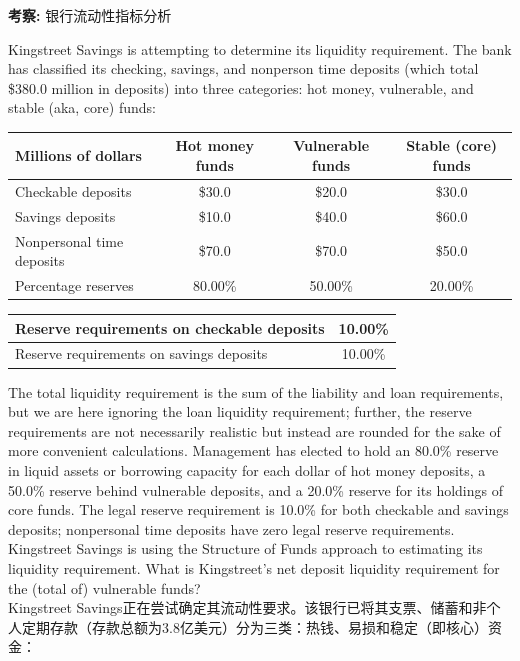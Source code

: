\documentclass{article}
\newcounter{question} %
\newcommand{\checklist}[1]{
    \textbf{考察:} #1 \par %
    \addcontentsline{toc}{subsection}{题号\thequestion 考察: #1} %
    \vspace{2em} %
}
\begin{document}
\checklist{银行流动性指标分析}


\begin{question}
    Kingstreet Savings is attempting to determine its liquidity requirement. The bank has classified its checking, savings, and nonperson time deposits (which total \$380.0 million in deposits) into three categories: hot money, vulnerable, and stable (aka, core) funds:

    \begin{table}[htbp]
        \centering
        \begin{tabular}{|l|c|c|c|}
            \hline
            \textbf{Millions of dollars} & \textbf{Hot money funds} & \textbf{Vulnerable funds} & \textbf{Stable (core) funds} \\
            \hline
            Checkable deposits         & \$30.0 & \$20.0 & \$30.0 \\
            Savings deposits           & \$10.0 & \$40.0 & \$60.0 \\
            Nonpersonal time deposits  & \$70.0 & \$70.0 & \$50.0 \\
            \hline
            Percentage reserves        & 80.00\% & 50.00\% & 20.00\% \\
            \hline
        \end{tabular}
    \end{table}

    \begin{table}[htbp]
        \centering
        \begin{tabular}{|l|c|}
            \hline
            Reserve requirements on checkable deposits & 10.00\% \\
            \hline
            Reserve requirements on savings deposits   & 10.00\% \\
            \hline
        \end{tabular}
    \end{table}

    The total liquidity requirement is the sum of the liability and loan requirements, but we are here ignoring the loan liquidity requirement; further, the reserve requirements are not necessarily realistic but instead are rounded for the sake of more convenient calculations. Management has elected to hold an 80.0\% reserve in liquid assets or borrowing capacity for each dollar of hot money deposits, a 50.0\% reserve behind vulnerable deposits, and a 20.0\% reserve for its holdings of core funds. The legal reserve requirement is 10.0\% for both checkable and savings deposits; nonpersonal time deposits have zero legal reserve requirements. Kingstreet Savings is using the Structure of Funds approach to estimating its liquidity requirement. What is Kingstreet's net deposit liquidity requirement for the (total of) vulnerable funds?
    \\Kingstreet Savings正在尝试确定其流动性要求。该银行已将其支票、储蓄和非个人定期存款（存款总额为3.8亿美元）分为三类：热钱、易损和稳定（即核心）资金：


\end{question}
\end{document}
